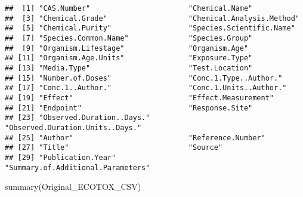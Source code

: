 \documentclass[
  12pt,
]{article}
\newenvironment{Shaded}{\begin{snugshade}}{\end{snugshade}}
\newcommand{\FunctionTok}[1]{\textcolor[rgb]{0.00,0.00,0.00}{#1}}
\newcommand{\NormalTok}[1]{#1}
\begin{document}
\begin{verbatim}
##  [1] "CAS.Number"                       "Chemical.Name"                   
##  [3] "Chemical.Grade"                   "Chemical.Analysis.Method"        
##  [5] "Chemical.Purity"                  "Species.Scientific.Name"         
##  [7] "Species.Common.Name"              "Species.Group"                   
##  [9] "Organism.Lifestage"               "Organism.Age"                    
## [11] "Organism.Age.Units"               "Exposure.Type"                   
## [13] "Media.Type"                       "Test.Location"                   
## [15] "Number.of.Doses"                  "Conc.1.Type..Author."            
## [17] "Conc.1..Author."                  "Conc.1.Units..Author."           
## [19] "Effect"                           "Effect.Measurement"              
## [21] "Endpoint"                         "Response.Site"                   
## [23] "Observed.Duration..Days."         "Observed.Duration.Units..Days."  
## [25] "Author"                           "Reference.Number"                
## [27] "Title"                            "Source"                          
## [29] "Publication.Year"                 "Summary.of.Additional.Parameters"
\end{verbatim}

\begin{Shaded}
\begin{Highlighting}[]
\FunctionTok{summary}\NormalTok{(Original\_ECOTOX\_CSV)}
\end{Highlighting}
\end{Shaded}
\end{document}
